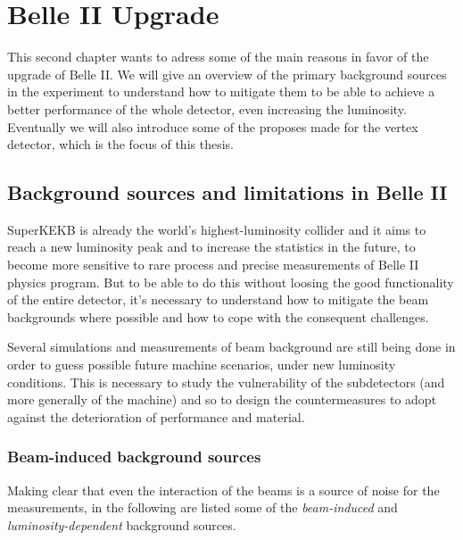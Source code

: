 \chapter{Belle II Upgrade}

This second chapter wants to adress some of the main reasons in favor of the upgrade of Belle II. We will give an overview of the primary background sources in the experiment to understand how to mitigate them to be able to achieve a better performance of the whole detector, even increasing the luminosity. Eventually we will also introduce some of the proposes made for the vertex detector, which is the focus of this thesis.


\section{Background sources and limitations in Belle II}

SuperKEKB is already the world's highest-luminosity collider and it aims to reach a new luminosity peak and to increase the statistics in the future, to become more sensitive to rare process and precise measurements of Belle II physics program. 
But to be able to do this without loosing the good functionality of the entire detector, it's necessary to understand how to mitigate the beam backgrounds where possible and how to cope with the consequent challenges.

Several simulations and measurements of beam background are still being done in order to guess possible future machine scenarios, under new luminosity conditions.
This is necessary to study the vulnerability of the subdetectors (and more generally of the machine) and so to design the countermeasures to adopt against the deterioration of performance and material.


\subsection{Beam-induced background sources}

Making clear that even the interaction of the beams is a source of noise for the measurements, in the following are listed some of the \textit{beam-induced} and \textit{luminosity-dependent} background sources.


